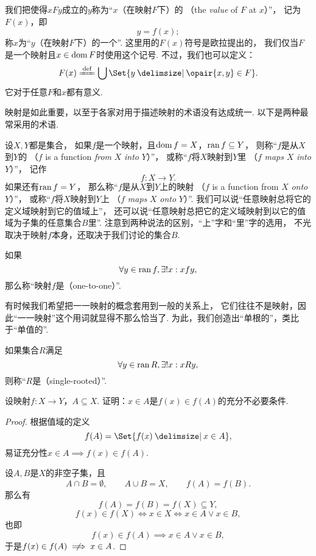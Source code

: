 我们把使得\(xFy\)成立的\(y\)称为“\(x\)（在映射\(F\)下）的%
（the \emph{value} of \(F\) at \(x\)）”，
记为\(F(x)\)，即\[
	y = f(x);
\]
称\(x\)为“\(y\)（在映射\(F\)下）的一个”.
这里用的\(F(x)\)符号是欧拉提出的，
我们仅当\(F\)是一个映射且\(x\in\operatorname{dom} F\)时使用这个记号.
不过，我们也可以定义：\[
	F(x) \defeq \bigcup\Set{ y \given \opair{x,y} \in F }.
\]
它对于任意\(F\)和\(x\)都有意义.

映射是如此重要，以至于各家对用于描述映射的术语没有达成统一.
以下是两种最常采用的术语.

设\(X,Y\)都是集合，
如果\(f\)是一个映射，且\(\operatorname{dom} f = X\)，\(\operatorname{ran} f \subseteq Y\)，
则称“\(f\)是从\(X\)到\(Y\)的%
（\(f\) is a function \emph{from} \(X\) \emph{into} \(Y\)）”，
或称“\(f\)将\(X\)映射到\(Y\)里%
（\(f\) \emph{maps} \(X\) \emph{into} \(Y\)）”，
记作\[
	f\colon X \to Y.
\]
如果还有\(\operatorname{ran} f = Y\)，
那么称“\(f\)是从\(X\)到\(Y\)上的映射%
（\(f\) is a function from \(X\) \emph{onto} \(Y\)）”，
或称“\(f\)将\(X\)映射到\(Y\)上%
（\(f\) \emph{maps} \(X\) \emph{onto} \(Y\)）”.
我们可以说“任意映射总将它的定义域映射到它的值域上”，
还可以说“任意映射总把它的定义域映射到以它的值域为子集的任意集合\(B\)里”.
注意到两种说法的区别，“上”字和“里”字的选用，
不光取决于映射\(f\)本身，还取决于我们讨论的集合\(B\).

如果\[
	\forall y \in \operatorname{ran} f,
	\exists! x:
	x f y,
\]
那么称“映射\(f\)是（one-to-one）”.

有时候我们希望把一一映射的概念套用到一般的关系上，
它们往往不是映射，因此“一一映射”这个用词就显得不那么恰当了.
为此，我们创造出“单根的”，类比于“单值的”.

\begin{definition}
如果集合\(R\)满足\[
	\forall y \in \operatorname{ran} R,
	\exists! x:
	x R y,
\]
则称“\(R\)是（single-rooted）”.
\end{definition}

\begin{example}
设映射\(f\colon X \to Y\)，\(A \subseteq X\).
证明：\(x \in A\)是\(f(x) \in f(A)\)的充分不必要条件.
\begin{proof}
根据值域的定义\[
	f(A) = \Set{ f(x) \given x \in A },
\]
易证充分性\(x \in A \implies f(x) \in f(A)\).

设\(A,B\)是\(X\)的非空子集，且\[
	A \cap B = \emptyset,
	\qquad
	A \cup B = X,
	\qquad
	f(A) = f(B).
\]那么有\[
	f(A) = f(B) = f(X) \subseteq Y,
\]\[
	f(x) \in f(X) \iff x \in X \iff x \in A \lor x \in B,
\]也即\[
	f(x) \in f(A) \implies x \in A \lor x \in B,
\]
于是\(f(x) \in f(A) \notimplies x \in A\).
\end{proof}
\end{example}

